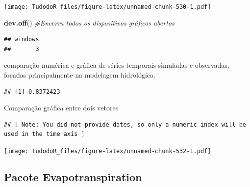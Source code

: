 \documentclass[
]{book}
\newenvironment{Shaded}{\begin{snugshade}}{\end{snugshade}}
\newcommand{\CommentTok}[1]{\textcolor[rgb]{0.56,0.35,0.01}{\textit{#1}}}
\newcommand{\DataTypeTok}[1]{\textcolor[rgb]{0.13,0.29,0.53}{#1}}
\newcommand{\KeywordTok}[1]{\textcolor[rgb]{0.13,0.29,0.53}{\textbf{#1}}}
\newcommand{\NormalTok}[1]{#1}
\newcommand{\OperatorTok}[1]{\textcolor[rgb]{0.81,0.36,0.00}{\textbf{#1}}}
\begin{document}
\texttt{[image: TudodoR\_files/figure-latex/unnamed-chunk-530-1.pdf]}

\begin{Shaded}
\begin{Highlighting}[]
\KeywordTok{dev.off}\NormalTok{() }\CommentTok{#Encerra todos os dispositivos gráficos abertos}
\end{Highlighting}
\end{Shaded}

\begin{verbatim}
## windows 
##       3
\end{verbatim}

comparação numérica e gráfica de séries temporais simuladas e observadas, focadas principalmente na modelagem hidrológica.

\begin{Shaded}
\end{Shaded}

\begin{verbatim}
## [1] 0.8372423
\end{verbatim}

Comparação gráfica entre dois vetores

\begin{Shaded}
\end{Shaded}

\begin{verbatim}
## [ Note: You did not provide dates, so only a numeric index will be used in the time axis ]
\end{verbatim}

\texttt{[image: TudodoR\_files/figure-latex/unnamed-chunk-532-1.pdf]}

\hypertarget{pacote-evapotranspiration}{%
\subsection{Pacote Evapotranspiration}\label{pacote-evapotranspiration}}
\end{document}
